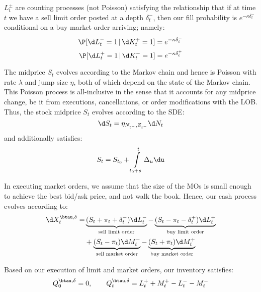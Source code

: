\documentclass[12pt]{article}
\begin{document}
$L^{\pm}_t$ are counting processes (not Poisson) satisfying the relationship that if at time $t$ we have a sell limit order posted at a depth $\delta^{-}_t$, then our fill probability is $e^{-\kappa \delta^{-}_t}$ conditional on a buy market order arriving; namely:
\[ \P [\d L^{-}_t = 1 \, | \, \d K^+_t = 1] = e^{-\kappa \delta^{-}_t} \]
\[ \P [\d L^{+}_t = 1 \, | \, \d K^{-}_t = 1] = e^{-\kappa \delta^{+}_t} \]

The midprice $S_t$ evolves according to the Markov chain and hence is Poisson with rate $\lambda$ and jump size $\eta$, both of which depend on the state of the Markov chain. This Poisson process is all-inclusive in the sense that it accounts for any midprice change, be it from executions, cancellations, or order modifications with the LOB. Thus, the stock midprice $S_t$ evolves according to the SDE:
\begin{equation}\label{eq:stockprocess}
\d S_t = \eta_{N_{t^-},Z_{t^-}} \d N_t
\end{equation}
and additionally satisfies:
\begin{equation}\label{eq:stockintegral} 
S_t = S_{t_0} + \int\limits_{t_0 + s}^t \Delta_u \du
\end{equation}

In executing market orders, we assume that the size of the MOs is small enough to achieve the best bid/ask price, and not walk the book. Hence, our cash process evolves according to:
\begin{equation}\label{eq:cashprocess}
\begin{split}
\d X^{\btau, \delta}_t = 	&\underbrace{(S_t + \pi_t + \delta^{-}_t) \d L^{-}_t}_{\text{sell limit order}} - \underbrace{(S_t - \pi_t - \delta^{+}_t) \d L^{+}_t}_{\text{buy limit order}} \\
						&+ \underbrace{(S_t - \pi_t) \d M^{-}_t}_{\text{sell market order}} - \underbrace{(S_t + \pi_t) \d M^{+}_t}_{\text{buy market order}}
\end{split}
\end{equation}

Based on our execution of limit and market orders, our inventory satisfies:
\begin{equation}\label{eq:inventory}
Q^{\btau, \delta}_0 = 0, \qquad Q^{\btau, \delta}_t = L^+_t + M^+_t - L^-_t - M^-_t
\end{equation}
\end{document}
